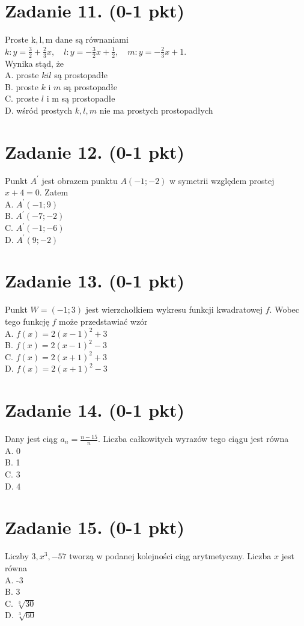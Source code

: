 \documentclass[10pt]{article}
\begin{document}
\section*{Zadanie 11. (0-1 pkt)}
Proste \(\mathrm{k}, \mathrm{l}, \mathrm{m}\) dane są równaniami \(k: y=\frac{3}{2}+\frac{2}{3} x, \quad l: y=-\frac{3}{2} x+\frac{1}{2}, \quad m: y=-\frac{2}{3} x+1\).\\
Wynika stąd, że\\
A. proste \(k i l\) są prostopadłe\\
B. proste \(k\) i \(m\) są prostopadłe\\
C. proste \(l\) i m są prostopadłe\\
D. wśród prostych \(k, l, m\) nie ma prostych prostopadłych

\section*{Zadanie 12. (0-1 pkt)}
Punkt \(A^{\prime}\) jest obrazem punktu \(A(-1 ;-2)\) w symetrii względem prostej \(x+4=0\). Zatem\\
A. \(A^{\prime}(-1 ; 9)\)\\
B. \(A^{\prime}(-7 ;-2)\)\\
C. \(A^{\prime}(-1 ;-6)\)\\
D. \(A^{\prime}(9 ;-2)\)

\section*{Zadanie 13. (0-1 pkt)}
Punkt \(W=(-1 ; 3)\) jest wierzchołkiem wykresu funkcji kwadratowej \(f\). Wobec tego funkcję \(f\) może przedstawiać wzór\\
A. \(f(x)=2(x-1)^{2}+3\)\\
B. \(f(x)=2(x-1)^{2}-3\)\\
C. \(f(x)=2(x+1)^{2}+3\)\\
D. \(f(x)=2(x+1)^{2}-3\)

\section*{Zadanie 14. (0-1 pkt)}
Dany jest ciąg \(a_{n}=\frac{n-15}{n}\). Liczba całkowitych wyrazów tego ciągu jest równa\\
A. 0\\
B. 1\\
C. 3\\
D. 4

\section*{Zadanie 15. (0-1 pkt)}
Liczby \(3, x^{3},-57\) tworzą w podanej kolejności ciąg arytmetyczny. Liczba \(x\) jest równa\\
A. -3\\
B. 3\\
C. \(\sqrt[3]{30}\)\\
D. \(\sqrt[3]{60}\)
\end{document}
